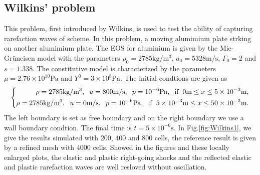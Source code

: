 \documentclass{article}
\numberwithin{equation}{section}
\numberwithin{table}{section}
\begin{document}
\subsection{Wilkins' problem}
This problem, first introduced by Wilkins, is used to test the  ability of capturing rarefaction waves of scheme. In this problem, a moving alumimium plate strking on another alumimium plate. The EOS for aluminium is given by the Mie-Gr\"uneisen model with the parameters $\rho_0 = 2785 \text{kg}/\text{m}^3$, $ a_0 = 5328 \text{m} /\text{s}$, $\Gamma_0 =2$ and $s = 1.338$. The constitutive model is characterized by the parameters $\mu = 2.76\times 10^{10} \text{Pa}$ and $Y^0 = 3\times 10^8 \text{Pa}$. The initial condtions are given as
\begin{equation}
  \left\{ \begin{aligned}
	  \rho = 2785 \text{kg}/\text{m}^3, \hspace{0.2cm} u = 800\text{m}/\text{s}, \hspace{0.2cm} p = 10^{-6}\text{Pa}, \hspace{0.2cm} \text{if} \hspace{0.2cm} 0\text{m} \le x \le 5\times 10^{-3} \text{m},\\
	  \rho = 2785 \text{kg}/\text{m}^3, \hspace{0.2cm} u = 0\text{m}/\text{s}, \hspace{0.2cm} p = 10^{-6}\text{Pa}, \hspace{0.2cm} \text{if} \hspace{0.2cm} 5 \times 10^{-3}\text{m} \le x \le 50\times 10^{-3} \text{m}.\\
	\end{aligned}
  \right.
\end{equation}
The left boundary is set as free boundary and on  the right boundary  we use a wall boundary condtion. The final time is $t =5\times 10^{-6} \text{s}$. In Fig.\ref{fig:Wilkins1}, we give the results  simulated with 200, 400 and 800 cells, the reference result is given by a refined mesh with 4000 cells. Showed in the figures and these locally enlarged plots, the elastic  and plastic right-going shocks and the reflected elastic and plastic rarefaction waves are well resloved without oscillation.
\end{document}
